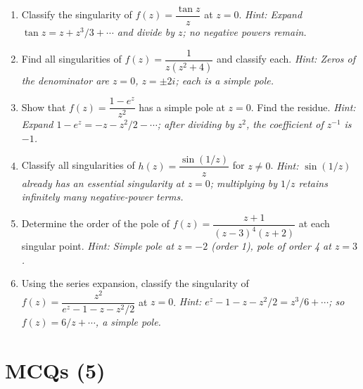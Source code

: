 \documentclass[12pt,a4paper]{article}
\begin{document}
\begin{enumerate}[label=\textbf{P\arabic*.}, leftmargin=2.5em]

\item Classify the singularity of $f(z) = \dfrac{\tan z}{z}$ at $z = 0$.
  \textit{Hint: Expand $\tan z = z + z^3/3 + \cdots$ and divide by $z$; no negative powers remain.}

\item Find all singularities of $f(z) = \dfrac{1}{z(z^2+4)}$ and classify each.
  \textit{Hint: Zeros of the denominator are $z = 0$, $z = \pm 2i$; each is a simple pole.}

\item Show that $f(z) = \dfrac{1 - e^z}{z^2}$ has a simple pole at $z = 0$. Find the residue.
  \textit{Hint: Expand $1 - e^z = -z - z^2/2 - \cdots$; after dividing by $z^2$, the coefficient
  of $z^{-1}$ is $-1$.}

\item Classify all singularities of $h(z) = \dfrac{\sin(1/z)}{z}$ for $z \neq 0$.
  \textit{Hint: $\sin(1/z)$ already has an essential singularity at $z = 0$; multiplying by $1/z$
  retains infinitely many negative-power terms.}

\item Determine the order of the pole of $f(z) = \dfrac{z+1}{(z-3)^4(z+2)}$ at each singular
  point.
  \textit{Hint: Simple pole at $z = -2$ (order 1), pole of order 4 at $z = 3$.}

\item Using the series expansion, classify the singularity of
  $f(z) = \dfrac{z^2}{e^z - 1 - z - z^2/2}$ at $z = 0$.
  \textit{Hint: $e^z - 1 - z - z^2/2 = z^3/6 + \cdots$; so $f(z) = 6/z + \cdots$, a simple pole.}

\end{enumerate}

\section{MCQs (5)}
\end{document}
